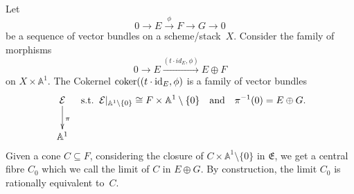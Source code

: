 \documentclass[pdftex]{sigma}
\numberwithin{equation}{section}
\newcommand{\E}{\mathfrak E}
\begin{document}
\begin{construction}\label{defvb}
Let
\[
0\rightarrow E\xrightarrow{\phi} F\rightarrow G\rightarrow 0
\]
be a sequence of vector bundles on a scheme/stack~$X$. Consider the family of morphisms
\[
0\rightarrow E\xrightarrow{(t\cdot id_E,\phi)} E\oplus F
\]
on $X\times\mathbb A^1$. The Cokernel $\operatorname{coker}((t\cdot {\rm id}_E,\phi)$ is a family of vector bundles
\begin{align*}
\xymatrix{\mathcal{E}\ar[d]^{\pi}\\
\mathbb{A}^1}\;\;\;\text{s.t.}\;\;\mathcal{E}\rvert_{\mathbb{A}^1\setminus\{0\}}\cong F\times \mathbb{A}^1\setminus\{0\}\quad
\text{and}\quad \pi^{-1}(0)=E\oplus G.
\end{align*}
Given a cone $C\subseteq F$, considering the closure of $C\times \mathbb{A}^1\setminus \{0 \}$ in $\E$, we get a central fibre $C_0$ which we call the limit of $C$ in $E\oplus G$. By construction, the limit $C_0$ is rationally equivalent to~$C$.
\end{construction}
\end{document}
